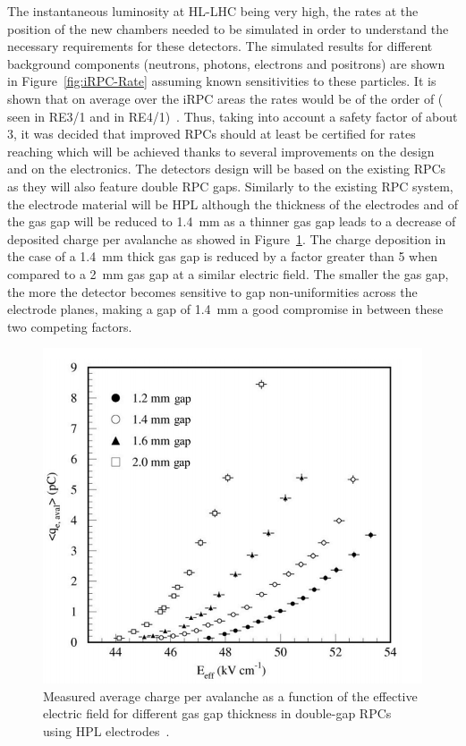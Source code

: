 	The instantaneous luminosity at HL-LHC being very high, the rates at the position of the new chambers needed to be simulated in order to understand the necessary requirements for these detectors. The simulated results for different background components (neutrons, photons, electrons and positrons) are shown in Figure~\ref{fig:iRPC-Rate} assuming known sensitivities to these particles. It is shown that on average over the iRPC areas the rates would be of the order of  ( seen in RE3/1 and  in RE4/1)~\cite{ANDREA2018,ANDREA2018PROC}. Thus, taking into account a safety factor of about 3, it was decided that improved RPCs should at least be certified for rates reaching  which will be achieved thanks to several improvements on the design and on the electronics. The detectors design will be based on the existing RPCs as they will also feature double RPC gaps. Similarly to the existing RPC system, the electrode material will be HPL although the thickness of the electrodes and of the gas gap will be reduced to \SI{1.4}{mm} as a thinner gas gap leads to a decrease of deposited charge per avalanche as showed in Figure~\ref{fig:charge-gap}. The charge deposition in the case of a \SI{1.4}{mm} thick gas gap is reduced by a factor greater than 5 when compared to a \SI{2}{mm} gas gap at a similar electric field. The smaller the gas gap, the more the detector becomes sensitive to gap non-uniformities across the electrode planes, making a gap of \SI{1.4}{mm} a good compromise in between these two competing factors.

\begingroup\setlength{\intextsep}{0pt}\setlength{\columnsep}{15pt}

	\begin{figure}
		\centering
		\includegraphics[width=\linewidth]{fig/chapt4/charge-vs-gap.png}
		\caption{\label{fig:charge-gap} Measured average charge per avalanche as a function of the effective electric field for different gas gap thickness in double-gap RPCs using HPL electrodes~\cite{PHASEIITP}.}
	\end{figure}
	
